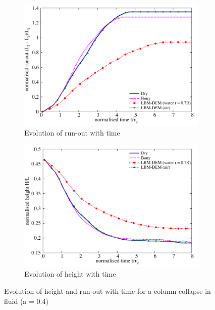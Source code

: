 \begin{figure}[htpb]
\centering
\begin{subfigure}[t]{0.9\textwidth}
\includegraphics[width=\textwidth]{Runout_a04f}
\caption{Evolution of run-out with time}
\label{fig:Runout_a04f}
\end{subfigure}

\begin{subfigure}[t]{0.9\textwidth}
\centering
\includegraphics[width=\textwidth]{Height_a04f}
\caption{Evolution of height with time}
\label{fig:Height_a04f}
\end{subfigure}
\caption{Evolution of height and run-out with time for a column collapse in 
fluid (a = 0.4)}
\label{fig:a04_run_height}
\end{figure}


